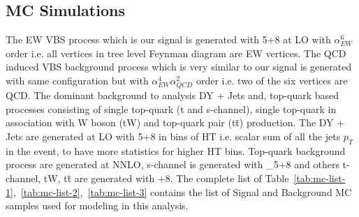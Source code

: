 \subsection{
  MC Simulations
}

The \gls{EW} \gls{VBS} process which is our signal is
generated with \MADGRAPH{}5+\PYTHIA{}8 at \gls{LO} with \( \alpha_{EW}^{6} \) order
i.e.
all vertices in tree level Feynman diagram are \gls{EW} vertices.
The \gls{QCD} induced \gls{VBS} background process which is very
similar to our signal is generated with same configuration
but with \( \alpha_{EW}^{4} \alpha_{QCD}^{2} \) order i.e.
two of the six vertices are \gls{QCD}. The dominant background to analysis
\gls{DY} + Jets and, top-quark based processes consisting of
single top-quark (t and s-channel),
single top-quark in association with W boson (tW) and top-quark pair (t\=t) production.
The \gls{DY} + Jets are generated at \gls{LO} with \MADGRAPH{}5+\PYTHIA{}8
in bins of HT i.e.
scalar sum of all the jets \( p_{T} \) in the event, to have more statistics
for higher HT bins. Top-quark background process are generated at \gls{NNLO},
s-channel is generated with \MADGRAPH{}\_\MCATNLO{}5+\PYTHIA{}8 and others
t-channel, tW, t\=t are generated with \POWHEG{}+\PYTHIA{}8.
The complete list of Table~\ref{tab:mc-list-1},~\ref{tab:mc-list-2},~\ref{tab:mc-list-3} contains
the list of Signal and Background MC samples used for modeling in this analysis.


